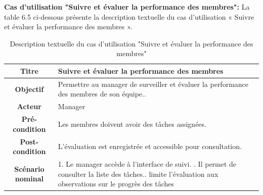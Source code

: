       \item \textbf{Cas d'utilisation "Suivre et évaluer la performance des membres": } La table 6.5 ci-dessous présente la description textuelle du cas d'utilisation « Suivre et évaluer la performance des membres ».
 \begin{table}[H]
 \caption{ Description textuelle du cas d’utilisation "Suivre et évaluer la performance des membres"}
    \centering
    \begin{tabular}{|c|p{12cm}|}
    \hline
    \textbf{Titre} & Suivre et évaluer la performance des membres\\
    \hline
    \textbf{Objectif} & Permettre au manager de surveiller et évaluer la performance des membres de son équipe.. \\
    \hline
    \textbf{Acteur}& Manager\\
    \hline
    \textbf{Pré-condition} & Les membres doivent avoir des tâches assignées.
    \\
    \hline
    \textbf{Post-condition} & L’évaluation est enregistrée et accessible pour consultation.\\
    \hline
    \textbf{Scénario nominal} & 1. Le manager accède à l’interface de suivi. \newline
    2. Il permet de consulter la liste des tâches.\newline
    3. limite l’évaluation aux observations sur le progrès des tâches\\
    \hline
    \end{tabular}
    \label{tab:user_stories}
\end{table}

